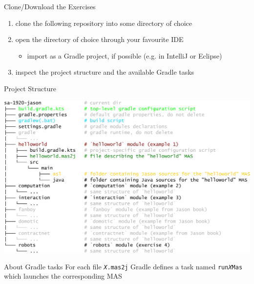 \documentclass[presentation]{beamer}\mode<presentation>{\usetheme{AMSBolognaFC}}
\begin{document}
\begin{frame}[c]{Clone/Download the Exercises}
    \begin{enumerate}	
        \item clone the following repository into some directory of choice
        \begin{center}
        \end{center}
    
        \vfill
    
        \item open the directory of choice through your favourite IDE
        \begin{itemize}
            \item import as a Gradle project, if possible (e.g. in IntelliJ or Eclipse)
        \end{itemize}
        
        \vfill
        
        \item inspect the project structure and the available Gradle tasks
    \end{enumerate}
\end{frame}

\begin{frame}[c]{Project Structure}

\centering
\includegraphics[width=.7\linewidth]{figures/project-structure.pdf}

\begin{block}{About Gradle tasks}
    For each file \texttt{\textit{X}.mas2j} Gradle defines a task named \alert{\texttt{run\textit{X}Mas}} which launches the corresponding \jason{} MAS
\end{block}

\end{frame}

\end{document}
